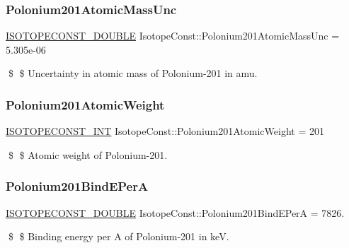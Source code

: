 \subsubsection{\texorpdfstring{Polonium201\+Atomic\+Mass\+Unc}{Polonium201AtomicMassUnc}}
{\footnotesize\ttfamily \mbox{\hyperlink{group___isotope_const-_macros_ga8f45a7272ce02c0b4c65c44636ed719a}{I\+S\+O\+T\+O\+P\+E\+C\+O\+N\+S\+T\+\_\+\+D\+O\+U\+B\+LE}} Isotope\+Const\+::\+Polonium201\+Atomic\+Mass\+Unc = 5.\+305e-\/06}

\$ \$ Uncertainty in atomic mass of Polonium-\/201 in amu. \mbox{\label{group___isotope_const-_polonium-_po201_gae874f593963cc2d8e901e608edff8925}} 
\subsubsection{\texorpdfstring{Polonium201\+Atomic\+Weight}{Polonium201AtomicWeight}}
{\footnotesize\ttfamily \mbox{\hyperlink{group___isotope_const-_macros_ga5f18360b3e99483a35c32d789e62621c}{I\+S\+O\+T\+O\+P\+E\+C\+O\+N\+S\+T\+\_\+\+I\+NT}} Isotope\+Const\+::\+Polonium201\+Atomic\+Weight = 201}

\$ \$ Atomic weight of Polonium-\/201. \mbox{\label{group___isotope_const-_polonium-_po201_gaced4d0ada12d7df48b78e4b19f1b5d33}} 
\subsubsection{\texorpdfstring{Polonium201\+Bind\+E\+PerA}{Polonium201BindEPerA}}
{\footnotesize\ttfamily \mbox{\hyperlink{group___isotope_const-_macros_ga8f45a7272ce02c0b4c65c44636ed719a}{I\+S\+O\+T\+O\+P\+E\+C\+O\+N\+S\+T\+\_\+\+D\+O\+U\+B\+LE}} Isotope\+Const\+::\+Polonium201\+Bind\+E\+PerA = 7826.}

\$ \$ Binding energy per A of Polonium-\/201 in keV. \mbox{\label{group___isotope_const-_polonium-_po201_ga253d9caa82e1a21877cbffc49a73c7f9}} 

